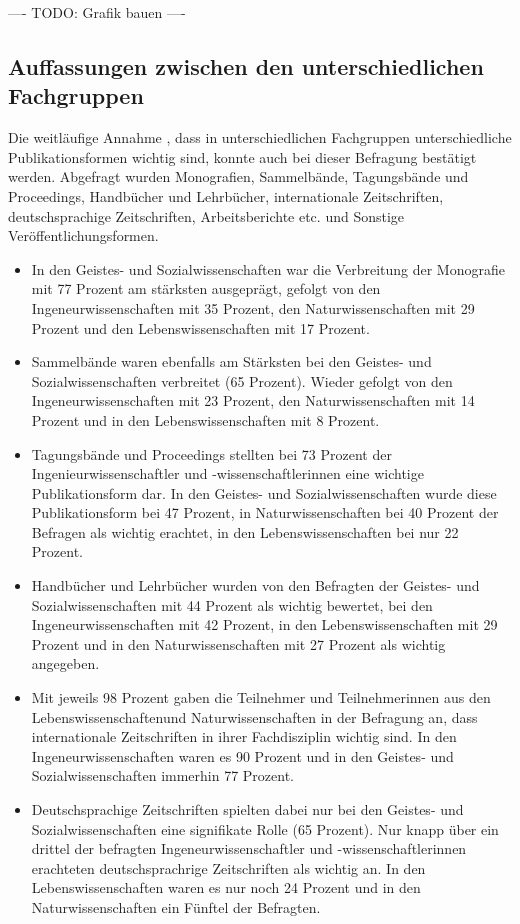 ---- TODO: Grafik bauen ----

\subsection{Auffassungen zwischen den unterschiedlichen Fachgruppen}

Die weitläufige Annahme \cite{naeder_2010_open}, dass in unterschiedlichen Fachgruppen unterschiedliche Publikationsformen wichtig sind, konnte auch bei dieser Befragung bestätigt werden. Abgefragt wurden Monografien, Sammelbände, Tagungsbände und Proceedings, Handbücher und Lehrbücher, internationale Zeitschriften, deutschsprachige Zeitschriften, Arbeitsberichte etc. und Sonstige Veröffentlichungsformen.

\begin{itemize}
\item In den Geistes- und Sozialwissenschaften war die Verbreitung der Monografie mit 77 Prozent am stärksten ausgeprägt, gefolgt von den Ingeneurwissenschaften mit 35 Prozent, den Naturwissenschaften mit 29 Prozent und den Lebenswissenschaften mit 17 Prozent.
\item Sammelbände waren ebenfalls am Stärksten bei den Geistes- und Sozialwissenschaften verbreitet (65 Prozent). Wieder gefolgt von den Ingeneurwissenschaften mit 23 Prozent, den Naturwissenschaften mit 14 Prozent und in den Lebenswissenschaften mit 8 Prozent.
\item Tagungsbände und Proceedings stellten bei 73 Prozent der Ingenieurwissenschaftler und -wissenschaftlerinnen eine wichtige Publikationsform dar. In den Geistes- und Sozialwissenschaften  wurde diese Publikationsform bei 47 Prozent, in Naturwissenschaften bei 40 Prozent der Befragen als wichtig erachtet, in den Lebenswissenschaften bei nur 22 Prozent.
\item Handbücher und Lehrbücher wurden von den Befragten der Geistes- und Sozialwissenschaften mit 44 Prozent als wichtig bewertet, bei den Ingeneurwissenschaften mit 42 Prozent, in den Lebenswissenschaften mit 29 Prozent und in den Naturwissenschaften mit 27 Prozent als wichtig angegeben.
\item Mit jeweils 98 Prozent gaben die Teilnehmer und Teilnehmerinnen aus den Lebenswissenschaftenund Naturwissenschaften in der Befragung an, dass internationale Zeitschriften in ihrer Fachdisziplin wichtig sind. In den Ingeneurwissenschaften waren es 90 Prozent und in den Geistes- und Sozialwissenschaften immerhin 77 Prozent.
\item Deutschsprachige Zeitschriften spielten dabei nur bei den Geistes- und Sozialwissenschaften eine signifikate Rolle (65 Prozent). Nur knapp über ein drittel der befragten Ingeneurwissenschaftler und -wissenschaftlerinnen erachteten deutschsprachrige Zeitschriften als wichtig an. In den Lebenswissenschaften waren es nur noch 24 Prozent und in den Naturwissenschaften ein Fünftel der Befragten.

\end{itemize}
